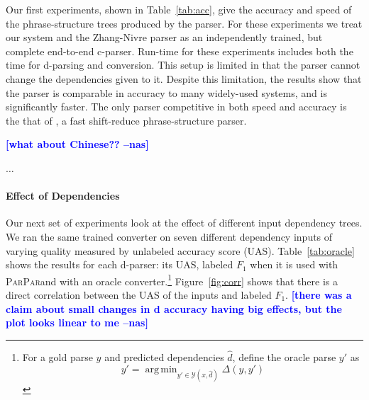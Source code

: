 \documentclass[11pt,letterpaper]{article}
\DeclareMathOperator*{\argmin}{arg\,min}
\newcommand{\ParseName}{\textsc{ParPar}}
\newcommand{\nascomment}[1]{\textcolor{blue}{\bf \small [#1 --nas]}}
\begin{document}
\begin{table}
  \caption{ Accuracy and speed on PTB \S 23 \nascomment{check!  said
      CTB as well}. Comparisons are to state-of-the-art non-reranking supervised
    phrase-structure parsers
    \cite{charniak2000maximum,klein2003accurate,petrov2007improved,carreras2008tag,zhu2013fast},
    and semi-supervised parsers \cite{charniak2005coarse,socher2013parsing}.
  \label{tab:acc}
}
\end{table}

Our first experiments, shown in Table~\ref{tab:acc}, give the accuracy
and speed
of the phrase-structure trees produced by the parser.  For these
experiments we treat our system and the Zhang-Nivre parser as an
independently trained, but complete end-to-end c-parser. Run-time 
for these experiments includes both the time for d-parsing and conversion. This setup
is limited in that the parser cannot change the dependencies given
to it. Despite this limitation, the results show that the parser is
comparable in accuracy to many widely-used systems, and is
significantly faster. The only parser competitive in both speed and
accuracy is the that of , a fast shift-reduce phrase-structure parser.

\nascomment{what about Chinese??}


$\ldots$


\paragraph{Effect of Dependencies}

Our next set of experiments look at the effect of different 
input dependency trees. We ran the same trained converter 
on seven different dependency inputs of varying quality measured 
by unlabeled accuracy score (UAS).
Table~\ref{tab:oracle}  shows the results for each d-parser:  its UAS,
labeled $F_1$ when it is used with \ParseName and with an oracle converter.\footnote{For a gold parse $y$ and predicted
dependencies $\hat{d}$, define the oracle parse $y'$ as
\[ y' = \argmin_{y' \in \mathcal{Y}(x, \hat{d})} \Delta(y, y') \]}
Figure~\ref{fig:corr}  shows that there is a direct correlation
between the UAS of the inputs and labeled $F_1$.
\nascomment{there was a claim about small changes in d accuracy having
  big effects, but the plot looks linear to me}
\end{document}

